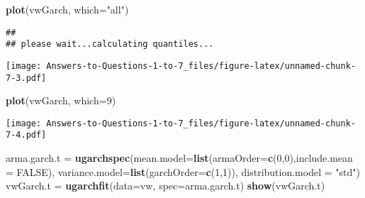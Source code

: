 \documentclass[
]{article}
\newenvironment{Shaded}{\begin{snugshade}}{\end{snugshade}}
\newcommand{\AttributeTok}[1]{\textcolor[rgb]{0.13,0.29,0.53}{#1}}
\newcommand{\ConstantTok}[1]{\textcolor[rgb]{0.56,0.35,0.01}{#1}}
\newcommand{\DecValTok}[1]{\textcolor[rgb]{0.00,0.00,0.81}{#1}}
\newcommand{\FunctionTok}[1]{\textcolor[rgb]{0.13,0.29,0.53}{\textbf{#1}}}
\newcommand{\NormalTok}[1]{#1}
\newcommand{\OtherTok}[1]{\textcolor[rgb]{0.56,0.35,0.01}{#1}}
\newcommand{\StringTok}[1]{\textcolor[rgb]{0.31,0.60,0.02}{#1}}
\begin{document}
\begin{Shaded}
\begin{Highlighting}[]
\FunctionTok{plot}\NormalTok{(vwGarch, }\AttributeTok{which=}\StringTok{"all"}\NormalTok{)}
\end{Highlighting}
\end{Shaded}

\begin{verbatim}
## 
## please wait...calculating quantiles...
\end{verbatim}

\texttt{[image: Answers-to-Questions-1-to-7\_files/figure-latex/unnamed-chunk-7-3.pdf]}

\begin{Shaded}
\begin{Highlighting}[]
\FunctionTok{plot}\NormalTok{(vwGarch, }\AttributeTok{which=}\DecValTok{9}\NormalTok{)}
\end{Highlighting}
\end{Shaded}

\texttt{[image: Answers-to-Questions-1-to-7\_files/figure-latex/unnamed-chunk-7-4.pdf]}

\begin{Shaded}
\begin{Highlighting}[]
\NormalTok{arma.garch.t }\OtherTok{=} \FunctionTok{ugarchspec}\NormalTok{(}\AttributeTok{mean.model=}\FunctionTok{list}\NormalTok{(}\AttributeTok{armaOrder=}\FunctionTok{c}\NormalTok{(}\DecValTok{0}\NormalTok{,}\DecValTok{0}\NormalTok{),}\AttributeTok{include.mean =} \ConstantTok{FALSE}\NormalTok{),}
\AttributeTok{variance.model=}\FunctionTok{list}\NormalTok{(}\AttributeTok{garchOrder=}\FunctionTok{c}\NormalTok{(}\DecValTok{1}\NormalTok{,}\DecValTok{1}\NormalTok{)),}
\AttributeTok{distribution.model =} \StringTok{"std"}\NormalTok{)}
\NormalTok{vwGarch.t }\OtherTok{=} \FunctionTok{ugarchfit}\NormalTok{(}\AttributeTok{data=}\NormalTok{vw, }\AttributeTok{spec=}\NormalTok{arma.garch.t)}
\FunctionTok{show}\NormalTok{(vwGarch.t)}
\end{Highlighting}
\end{Shaded}
\end{document}
